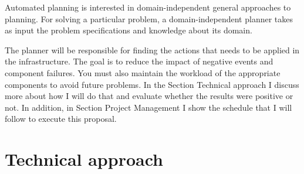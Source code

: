 \documentclass[letterpaper]{article}
\begin{document}
Automated planning is interested in domain-independent general approaches to planning. For solving a particular problem, a domain-independent planner takes as input the problem specifications and knowledge about its domain. \cite{book-automated-planning}

The planner will be responsible for finding the actions that needs to be applied in the infrastructure. The goal is to reduce the impact of negative events and component failures. You must also maintain the workload of the appropriate components to avoid future problems. In the Section Technical approach I discuss more about how I will do that and evaluate whether the results were positive or not. In addition, in Section Project Management I show the schedule that I will follow to execute this proposal.

\section{Technical approach}
\end{document}
